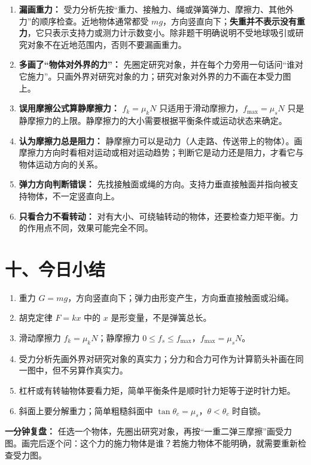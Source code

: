 \begin{mistakebox}
\begin{enumerate}
  \item \textbf{漏画重力：} 受力分析先按“重力、接触力、绳或弹簧弹力、摩擦力、其他外力”的顺序检查。近地物体通常都受 $mg$，方向竖直向下；\textbf{失重并不表示没有重力}，它只表示支持力或测力计示数变小。除非题干明确说明不受地球吸引或研究对象不在近地范围内，否则不要漏画重力。

  \item \textbf{多画了“物体对外界的力”：} 先圈定研究对象，并在每个力旁用一句话问“谁对它施力”。只画外界对研究对象的力；研究对象对外界的力不画在本受力图上。

  \item \textbf{误用摩擦公式算静摩擦力：} $f_k = \mu_k N$ 只适用于滑动摩擦力，$f_{\max}=\mu_sN$ 只是静摩擦力的上限。静摩擦力的大小需要根据平衡条件或运动状态来确定。

  \item \textbf{认为摩擦力总是阻力：} 静摩擦力可以是动力（人走路、传送带上的物体）。画摩擦力方向时看相对运动或相对运动趋势；判断它是动力还是阻力，才看它与物体运动方向的关系。

  \item \textbf{弹力方向判断错误：} 先找接触面或绳的方向。支持力垂直接触面并指向被支持物体，不一定竖直向上。

  \item \textbf{只看合力不看转动：} 对有大小、可绕轴转动的物体，还要检查力矩平衡。力的作用点不同，效果可能完全不同。
\end{enumerate}
\end{mistakebox}

\section*{十、今日小结}

{\small
\begin{enumerate}[nosep,leftmargin=2em]
  \item 重力 $G = mg$，方向竖直向下；弹力由形变产生，方向垂直接触面或沿绳。
  \item 胡克定律 $F = kx$ 中的 $x$ 是形变量，不是弹簧总长。
  \item 滑动摩擦力 $f_k = \mu_k N$；静摩擦力 $0 \leq f_s \leq f_{\max}$，$f_{\max}=\mu_sN$。
  \item 受力分析先画外界对研究对象的真实力；分力和合力可作为计算箭头补画在同一图中，但不另算作真实力。
  \item 杠杆或有转轴物体要看力矩，简单平衡条件是顺时针力矩等于逆时针力矩。
  \item 斜面上要分解重力；简单粗糙斜面中 $\tan\theta_c=\mu_s$，$\theta<\theta_c$ 时自锁。
\end{enumerate}

\textbf{一分钟复盘：} 任选一个物体，先圈出研究对象，再按“一重二弹三摩擦”画受力图。画完后逐个问：这个力的施力物体是谁？若施力物体不能明确，就需要重新检查受力图。
}
